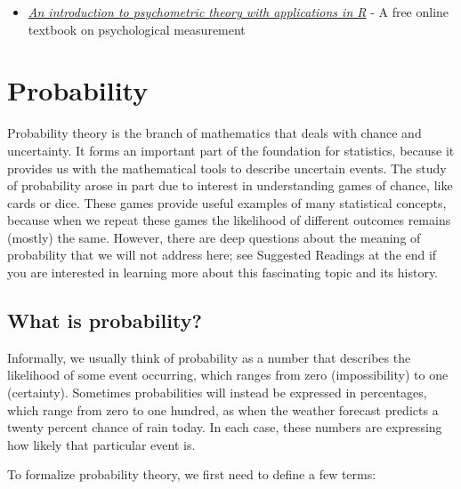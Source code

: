 \documentclass[]{book}
\providecommand{\tightlist}{%
  \setlength{\itemsep}{0pt}\setlength{\parskip}{0pt}}
\theoremstyle{definition}
\theoremstyle{definition}
\theoremstyle{definition}
\theoremstyle{remark}
\begin{document}
\begin{itemize}
\tightlist
\item
  \href{http://www.personality-project.org/r/book/}{\emph{An
  introduction to psychometric theory with applications in R}} - A free
  online textbook on psychological measurement
\end{itemize}

\chapter{Probability}\label{probability}

Probability theory is the branch of mathematics that deals with chance
and uncertainty. It forms an important part of the foundation for
statistics, because it provides us with the mathematical tools to
describe uncertain events. The study of probability arose in part due to
interest in understanding games of chance, like cards or dice. These
games provide useful examples of many statistical concepts, because when
we repeat these games the likelihood of different outcomes remains
(mostly) the same. However, there are deep questions about the meaning
of probability that we will not address here; see Suggested Readings at
the end if you are interested in learning more about this fascinating
topic and its history.

\section{What is probability?}\label{what-is-probability}

Informally, we usually think of probability as a number that describes
the likelihood of some event occurring, which ranges from zero
(impossibility) to one (certainty). Sometimes probabilities will instead
be expressed in percentages, which range from zero to one hundred, as
when the weather forecast predicts a twenty percent chance of rain
today. In each case, these numbers are expressing how likely that
particular event is.

To formalize probability theory, we first need to define a few terms:
\end{document}
